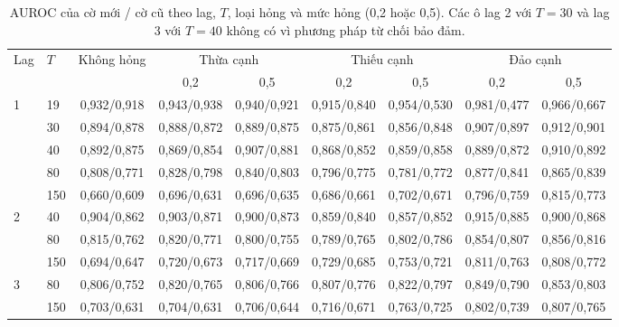 \begin{table}[H]
\centering
\caption{AUROC của cờ mới / cờ cũ theo lag, $T$, loại hỏng và mức hỏng (0,2 hoặc 0,5). Các ô lag 2 với $T=30$ và lag 3 với $T=40$ không có vì phương pháp từ chối bảo đảm.}\label{tab:flag-compact}
{\footnotesize
\setlength{\tabcolsep}{3.5pt}
\begin{tabular}{llccccccc}
\toprule
\multirow{2}{*}{Lag} & \multirow{2}{*}{$T$} & Không hỏng & \multicolumn{2}{c}{Thừa cạnh} & \multicolumn{2}{c}{Thiếu cạnh} & \multicolumn{2}{c}{Đảo cạnh} \\
\cmidrule(lr){4-5}\cmidrule(lr){6-7}\cmidrule(l){8-9}
 & & & 0,2 & 0,5 & 0,2 & 0,5 & 0,2 & 0,5 \\
\midrule
\multirow{5}{*}{1} & 19 & 0,932/0,918 & 0,943/0,938 & 0,940/0,921 & 0,915/0,840 & 0,954/0,530 & 0,981/0,477 & 0,966/0,667 \\
 & 30 & 0,894/0,878 & 0,888/0,872 & 0,889/0,875 & 0,875/0,861 & 0,856/0,848 & 0,907/0,897 & 0,912/0,901 \\
 & 40 & 0,892/0,875 & 0,869/0,854 & 0,907/0,881 & 0,868/0,852 & 0,859/0,858 & 0,889/0,872 & 0,910/0,892 \\
 & 80 & 0,808/0,771 & 0,828/0,798 & 0,840/0,803 & 0,796/0,775 & 0,781/0,772 & 0,877/0,841 & 0,865/0,839 \\
 & 150 & 0,660/0,609 & 0,696/0,631 & 0,696/0,635 & 0,686/0,661 & 0,702/0,671 & 0,796/0,759 & 0,815/0,773 \\
\midrule
\multirow{3}{*}{2} & 40 & 0,904/0,862 & 0,903/0,871 & 0,900/0,873 & 0,859/0,840 & 0,857/0,852 & 0,915/0,885 & 0,900/0,868 \\
 & 80 & 0,815/0,762 & 0,820/0,771 & 0,800/0,755 & 0,789/0,765 & 0,802/0,786 & 0,854/0,807 & 0,856/0,816 \\
 & 150 & 0,694/0,647 & 0,720/0,673 & 0,717/0,669 & 0,729/0,685 & 0,753/0,721 & 0,811/0,763 & 0,808/0,772 \\
\midrule
\multirow{2}{*}{3} & 80 & 0,806/0,752 & 0,820/0,765 & 0,806/0,766 & 0,807/0,776 & 0,822/0,797 & 0,849/0,790 & 0,853/0,803 \\
 & 150 & 0,703/0,631 & 0,704/0,631 & 0,706/0,644 & 0,716/0,671 & 0,763/0,725 & 0,802/0,739 & 0,807/0,765 \\
\bottomrule
\end{tabular}
}
\end{table}
